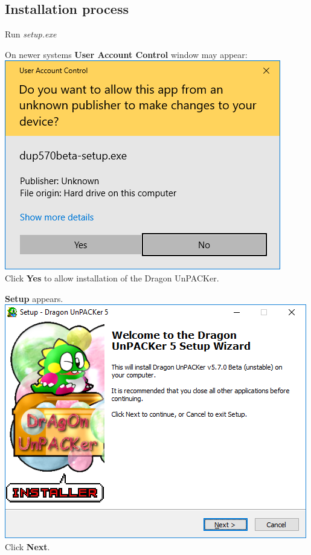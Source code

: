 \documentclass[10pt,a4paper,twoside]{book}
\makeatletter
\def\maxwidth#1{\ifdim\Gin@nat@width>#1 #1\else\Gin@nat@width\fi}
\makeatother
\begin{document}
\subsection{Installation process}
\begin{enumerate}
\begin{minipage}[t]{\linewidth}
\item Run \textit{setup.exe}\\
\end{minipage}

\begin{minipage}{\linewidth}
\item On newer systems \textbf{User Account Control} window may appear:\\
\includegraphics[width=\maxwidth{9cm}]{install/001-uac}\\
Click \textbf{Yes} to allow installation of the Dragon UnPACKer.\\
\end{minipage}

\begin{minipage}[t]{\linewidth}
\item \textbf{Setup} appears.\\
\includegraphics[width=\maxwidth{9cm}]{install/002-start}\\
Click \textbf{Next}.\\
\end{minipage}


\end{enumerate}
\end{document}
